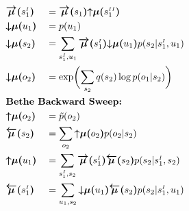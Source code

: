 \documentclass[fleqn]{article}
\begin{document}
\begin{minipage}[t]{0.5\textwidth}
\begin{alignat}{2}
         & \bm{\overrightarrow{\mu}(}s^{\scriptscriptstyle I}_1\bm{)} &  & = \bm{\overrightarrow{\mu}(}s_1\bm{)} \bm{{\uparrow}{\mu}(}s^{\scriptscriptstyle II}_1\bm{)}                                                                                   \\
         & \bm{{\downarrow}{\mu}(}u_1\bm{)}                           &  & = p(u_1)                                                                                                                                                                       \\
         & \bm{{\downarrow}{\mu}(}s_2\bm{)}                           &  & = \sum_{s^{\scriptscriptstyle I}_1, u_1} \bm{\overrightarrow{\mu}(}s^{\scriptscriptstyle I}_1\bm{)} \bm{{\downarrow}{\mu}(}u_1\bm{)} p(s_2|{s^{\scriptscriptstyle I}_1},u_1)   \\
         & \bm{{\downarrow}{\mu}(}o_2\bm{)}                           &  & = \exp \biggl( \sum_{s_2} q(s_2) \log p(o_1|s_2) \biggr)                                                                                                                       \\
         & \rlap{\text{\bfseries Bethe Backward Sweep:}} \nonumber                                                                                                                                                                                        \\
         & \bm{{\uparrow}{\mu}(}o_2\bm{)}                             &  & = \tilde{p}(o_2)                                                                                                                                                               \\
         & \bm{\overleftarrow{\mu}(}s_2\bm{)}                         &  & = \sum_{o_2} \bm{{\uparrow}{\mu}(}o_2\bm{)} p(o_2|s_2)                                                                                                                          \\
         & \bm{{\uparrow}{\mu}(}u_1\bm{)}                             &  & = \sum_{s^{\scriptscriptstyle I}_1, s_2} \bm{\overrightarrow{\mu}(}s^{\scriptscriptstyle I}_1\bm{)} \bm{\overleftarrow{\mu}(}s_2\bm{)} p(s_2|{s^{\scriptscriptstyle I}_1},s_2) \\
         & \bm{\overleftarrow{\mu}(}s^{\scriptscriptstyle I}_1\bm{)}  &  & = \sum_{u_1, s_2} \bm{{\downarrow}{\mu}(}u_1\bm{)} \bm{\overleftarrow{\mu}(}s_2\bm{)} p(s_2|s^{\scriptscriptstyle I}_1,u_1)
    \end{alignat}
\end{minipage}%
\end{document}
